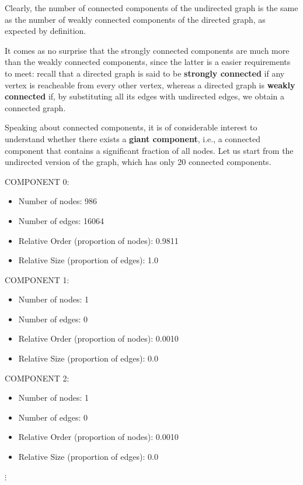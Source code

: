 \documentclass{report}
\theoremstyle{definition}
\theoremstyle{remark}
\begin{document}
Clearly, the number of connected components of the undirected graph is the same as the number of weakly connected components of the directed graph, as expected by definition.

It comes as no surprise that the strongly connected components are much more than the weakly connected components, since the latter is a easier requirements to meet: recall that a directed graph is said to be \textbf{strongly connected} if any vertex is reacheable from every other vertex, whereas a directed graph is \textbf{weakly connected} if, by substituting all its edges with undirected edges, we obtain a connected graph.

Speaking about connected components, it is of considerable interest to understand whether there exists a \textbf{giant component}, i.e., a connected component that contains a significant fraction of all nodes. Let us start from the undirected version of the graph, which has only 20 connected components.
\bigskip


COMPONENT 0:
\begin{itemize}
\item Number of nodes: 986
\item Number of edges: 16064
\item Relative Order (proportion of nodes): 0.9811
\item Relative Size (proportion of edges): 1.0\\
\end{itemize}

COMPONENT 1:
\begin{itemize}
\item Number of nodes: 1
\item Number of edges: 0
\item Relative Order (proportion of nodes): 0.0010
\item Relative Size (proportion of edges): 0.0\\
\end{itemize}


COMPONENT 2:
\begin{itemize}
\item Number of nodes: 1
\item Number of edges: 0
\item Relative Order (proportion of nodes): 0.0010
\item Relative Size (proportion of edges): 0.0\\
\end{itemize}

$\vdots$
\end{document}
